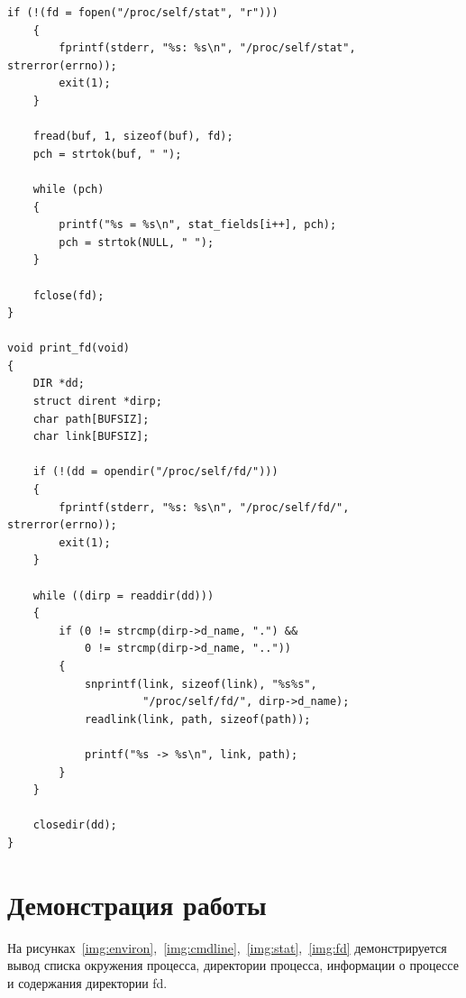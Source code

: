 \begin{lstlisting}[caption={Задание \textnumero1},label=lst:task01]
    if (!(fd = fopen("/proc/self/stat", "r")))
    {
        fprintf(stderr, "%s: %s\n", "/proc/self/stat", strerror(errno));
        exit(1);
    }

    fread(buf, 1, sizeof(buf), fd);
    pch = strtok(buf, " ");

    while (pch)
    {
        printf("%s = %s\n", stat_fields[i++], pch);
        pch = strtok(NULL, " ");
    }

    fclose(fd);
}

void print_fd(void)
{
    DIR *dd;
    struct dirent *dirp;
    char path[BUFSIZ];
    char link[BUFSIZ];

    if (!(dd = opendir("/proc/self/fd/")))
    {
        fprintf(stderr, "%s: %s\n", "/proc/self/fd/", strerror(errno));
        exit(1);
    }

    while ((dirp = readdir(dd)))
    {
        if (0 != strcmp(dirp->d_name, ".") &&
            0 != strcmp(dirp->d_name, ".."))
        {
            snprintf(link, sizeof(link), "%s%s",
                     "/proc/self/fd/", dirp->d_name);
            readlink(link, path, sizeof(path));

            printf("%s -> %s\n", link, path);
        }
    }

    closedir(dd);
}
\end{lstlisting}

\section{Демонстрация работы}

На рисунках~\ref{img:environ},~\ref{img:cmdline},~\ref{img:stat},~\ref{img:fd} демонстрируется вывод списка окружения процесса, директории процесса, информации о процессе и содержания директории fd.

